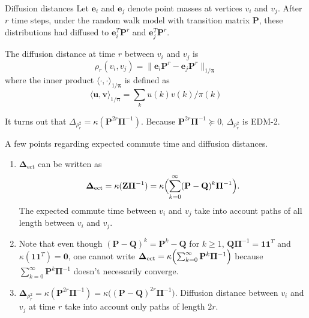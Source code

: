 \documentclass[professionalfonts,hyperref={pdfpagelabels=false,colorlinks=true,linkcolor=red}]{beamer}
\begin{document}
\begin{frame}{Diffusion distances}
  Let $\bm{e}_i$ and $\bm{e}_j$ denote point masses at vertices $v_i$ and
  $v_j$. After $r$ time steps, under the random walk model with
  transition matrix $\mathbf{P}$, these distributions had diffused to
  $\bm{e}_i^{T} \mathbf{P}^{r}$ and $\bm{e}_j^{T}\mathbf{P}^{r}$. 
  
  \vskip10pt The diffusion distance \cite{coifman06:_diffus_maps} at
  time $r$ between $v_i$ and $v_j$ is
    \begin{equation*}
      \rho_{r}(v_i,v_j) = \| \bm{e}_i \mathbf{P}^{r} - \bm{e}_j
      \mathbf{P}^{r} \|_{1/\bm{\pi}}
    \end{equation*}
    where the inner product $\langle \cdot, \cdot
    \rangle_{1/\bm{\pi}}$ is defined as
    \begin{equation*}
      \langle \bm{u}, \bm{v} \rangle_{1/\bm{\pi}} = \sum_{k} u(k)
      v(k)/\pi(k)
    \end{equation*}
    
      \vskip10pt
      It turns out that $\Delta_{\rho_{r}^{2}} =
      \kappa(\mathbf{P}^{2r}\bm{\Pi}^{-1})$. 
      Because $\mathbf{P}^{2r}\bm{\Pi}^{-1} \succeq 0$,
      $\Delta_{\rho_{r}^{2}}$ is EDM-2.  
\end{frame}

\begin{frame}
  A few points regarding expected commute time and diffusion
  distances.
  \begin{enumerate}
  \item $\bm{\Delta}_{\mathrm{ect}}$ can be written as
    \begin{equation*}
      \bm{\Delta}_{\mathrm{ect}} = \kappa(\mathbf{Z}\bm{\Pi}^{-1}) =
      \kappa\Bigl( \sum_{k=0}^{\infty}(\mathbf{P} -
      \mathbf{Q})^{k}\bm{\Pi}^{-1}\Bigr).
    \end{equation*}
    The expected commute time between $v_i$ and $v_j$ take into account
    paths of all length between $v_i$ and $v_j$.
  \item Note that even though $(\mathbf{P} - \mathbf{Q})^{k} =
    \mathbf{P}^{k} - \mathbf{Q}$ for $k \geq 1$,
    $\mathbf{Q}\bm{\Pi}^{-1} = \bm{1}\bm{1}^{T}$ and
    $\kappa(\bm{1}\bm{1}^{T}) = \bm{0}$, one cannot write
    $\bm{\Delta}_{\mathrm{ect}} =
    \kappa\Bigl(\sum_{k=0}^{\infty}\mathbf{P}^{k}\bm{\Pi}^{-1}\Bigr)$
    because $\sum_{k=0}^{\infty}\mathbf{P}^{k}\bm{\Pi}^{-1}$
    doesn't necessarily converge.
  \item $\bm{\Delta}_{\rho_{r}^{2}} =
    \kappa(\mathbf{P}^{2r}\bm{\Pi}^{-1}) = \kappa\bigl((\mathbf{P} -
    \mathbf{Q})^{2r}\bm{\Pi}^{-1}\bigr)$. Diffusion distance between
    $v_i$ and $v_j$ at time $r$ take into account only paths of length
    $2r$.
  \end{enumerate}
\end{frame}
\end{document}
